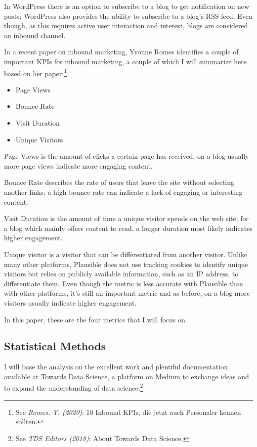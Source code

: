 In WordPress there is an option to subscribe to a blog to get notification on new posts; WordPress also provides the ability to subscribe to a blog's RSS feed. Even though, as this requires active user interaction and interest, blogs are considered an inbound channel.

In a recent paper on inbound marketing, Yvonne Romes identifies a couple of important KPIs for inbound marketing, a couple of which I will summarize here based on her paper:\footnote{See \textit{Romes, Y. (2020)}: 10 Inbound KPIs, die jetzt auch Personaler kennen sollten.\cite{inboundKPI}}

\begin{itemize}
\item Page Views
\item Bounce Rate
\item Visit Duration
\item Unique Visitors
\end{itemize}

Page Views is the amount of clicks a certain page has received; on a blog usually more page views indicate more engaging content.

Bounce Rate describes the rate of users that leave the site without selecting another links; a high bounce rate can indicate a lack of engaging or interesting content.

Visit Duration is the amount of time a unique visitor spends on the web site; for a blog which mainly offers content to read, a longer duration most likely indicates higher engagement.

Unique visitor is a visitor that can be differentiated from another visitor. Unlike many other platforms, Plausible does not use tracking cookies to identify unique visitors but relies on publicly available information, such as an IP address, to differentiate them. Even though the metric is less accurate with Plausible than with other platforms, it's still an important metric and as before, on a blog more visitors usually indicate higher engagement.

In this paper, these are the four metrics that I will focus on.

\subsection{Statistical Methods}

I will base the analysis on the excellent work and plentiful documentation available at Towards Data Science, a platform on Medium to exchange ideas and to expand the understanding of data science.\footnote{See \textit{TDS Editors (2018)}: About Towards Data Science.\cite{aboutTDS}}

